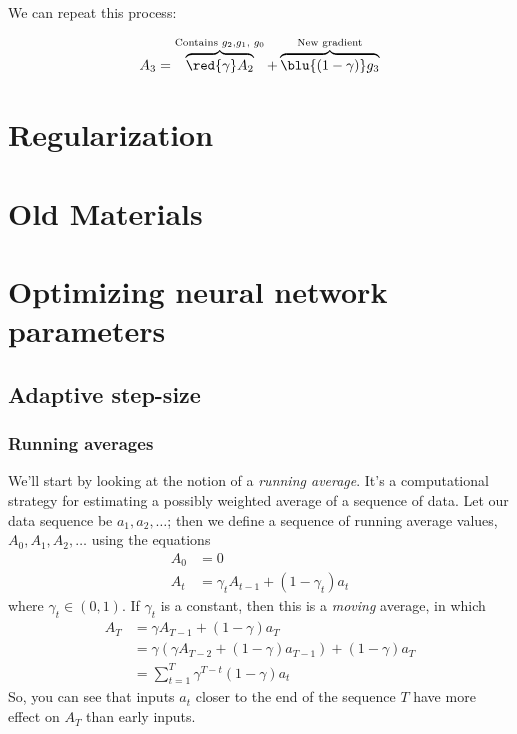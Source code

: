             We can repeat this process:
            
            \begin{equation}
                A_3 = 
                \overbrace{
                    \red{\gamma} A_{2}
                }^{\text{Contains $g_2$,$g_1$, $g_0$}}
                + 
                \overbrace{
                    \blu{(1-\gamma)} g_3
                }^{\text{New gradient}}
            \end{equation}
            
            
            
            
            

        
        
        
        
        
        
        
\section{Regularization}

\section{Old Materials}

\section{Optimizing neural network parameters}
\label{sec:make_nn_work}




\subsection{Adaptive step-size}



\subsubsection{Running averages}
We'll start by looking at the notion of a {\em running average}.  It's
a computational strategy for estimating a possibly weighted average of
a sequence  of data.  Let our data sequence be $a_1, a_2, \ldots$;
then we define a sequence of running average values, $A_0, A_1, A_2,
\ldots$ using the equations
\begin{align*}
A_0 &= 0 \\
A_t &=  \gamma_t A_{t-1} +  (1 - \gamma_t) a_t
\end{align*}
where $\gamma_t \in (0, 1)$.  If $\gamma_t$ is a constant, then this
is a {\em  moving} average, in which 
\begin{align*}
A_T & = \gamma A_{T-1} + (1  - \gamma) a_T \\
& = \gamma (\gamma A_{T-2} + (1  - \gamma) a_{T-1}) + (1  - \gamma) a_T \\
& = \sum_{t = 1}^T \gamma^{T-t}(1 - \gamma) a_t
\end{align*}
So, you can see that inputs $a_t$ closer to the end of the sequence $T$
have  more effect on $A_T$ than early inputs.

